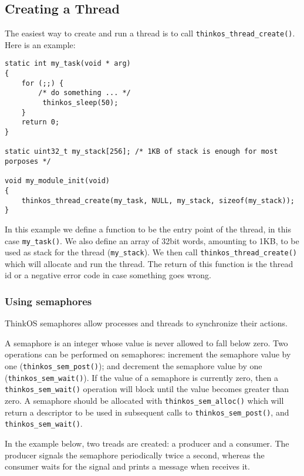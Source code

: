 \subsection{Creating a Thread}

The easiest way to create and run a thread is to call \lstinline{thinkos_thread_create()}. Here is an example: 

\begin{lstlisting}[caption={Simple Thread Create Example},label={lst:example1},language=C99,frame=single]
static int my_task(void * arg)
{
    for (;;) {
        /* do something ... */
         thinkos_sleep(50);
    }
    return 0;
}

static uint32_t my_stack[256]; /* 1KB of stack is enough for most porposes */

void my_module_init(void)
{
    thinkos_thread_create(my_task, NULL, my_stack, sizeof(my_stack));
}
\end{lstlisting}

In this example we define a function to be the entry point of the thread, in this case \lstinline{my_task()}. We also define an array of 32bit words, amounting to 1KB, to be used as stack for the thread (\lstinline{my_stack}). We then call \lstinline{thinkos_thread_create()} which will allocate and run the thread. The return of this function is the thread id or a negative error code in case something goes wrong.

\subsubsection{Using semaphores}

ThinkOS semaphores allow processes and threads to synchronize their actions.

A semaphore is an integer whose value is never allowed to fall below zero. Two operations can be performed on semaphores: increment the semaphore value by one (\lstinline{thinkos_sem_post()}); and decrement the semaphore value by one (\lstinline{thinkos_sem_wait()}). If the value of a semaphore is currently zero, then a \lstinline{thinkos_sem_wait()} operation will block until the value becomes greater than zero. A semaphore should be allocated with \lstinline{thinkos_sem_alloc()} which will return a descriptor to be used in subsequent calls to  \lstinline{thinkos_sem_post()}, and \lstinline{thinkos_sem_wait()}.

In the example below, two treads are created: a producer and a consumer. The producer signals the semaphore periodically twice a second, whereas the consumer waits for the signal and prints a message when receives it.


